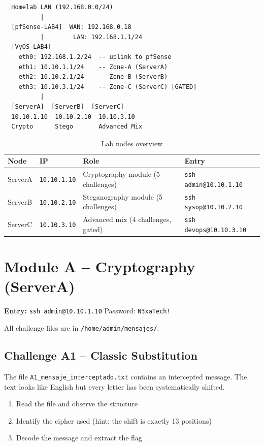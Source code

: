 \documentclass[a4paper, 12pt]{article}
\begin{document}
\begin{verbatim}
  Homelab LAN (192.168.0.0/24)
          |
  [pfSense-LAB4]  WAN: 192.168.0.18
          |        LAN: 192.168.1.1/24
  [VyOS-LAB4]
    eth0: 192.168.1.2/24  -- uplink to pfSense
    eth1: 10.10.1.1/24    -- Zone-A (ServerA)
    eth2: 10.10.2.1/24    -- Zone-B (ServerB)
    eth3: 10.10.3.1/24    -- Zone-C (ServerC) [GATED]
          |
  [ServerA]  [ServerB]  [ServerC]
  10.10.1.10  10.10.2.10  10.10.3.10
  Crypto      Stego       Advanced Mix
\end{verbatim}

\begin{table}[H]
\centering
\begin{tabularx}{0.92\textwidth}{llXl}
\toprule
\textbf{Node} & \textbf{IP} & \textbf{Role} & \textbf{Entry} \\
\midrule
ServerA & \texttt{10.10.1.10} & Cryptography module (5 challenges) & \texttt{ssh admin@10.10.1.10} \\
ServerB & \texttt{10.10.2.10} & Steganography module (5 challenges) & \texttt{ssh sysop@10.10.2.10} \\
ServerC & \texttt{10.10.3.10} & Advanced mix (4 challenges, gated) & \texttt{ssh devops@10.10.3.10} \\
\bottomrule
\end{tabularx}
\caption{Lab nodes overview}
\end{table}

\section{Module A -- Cryptography (ServerA)}

\textbf{Entry:} \texttt{ssh admin@10.10.1.10} \quad Password: \texttt{N3xaTech!}

All challenge files are in \texttt{/home/admin/mensajes/}.

\subsection{Challenge A1 -- Classic Substitution}

The file \texttt{A1\_mensaje\_interceptado.txt} contains an intercepted message.
The text looks like English but every letter has been systematically shifted.

\begin{enumerate}[leftmargin=2em]
  \item Read the file and observe the structure
  \item Identify the cipher used (hint: the shift is exactly 13 positions)
  \item Decode the message and extract the flag
\end{enumerate}
\end{document}
